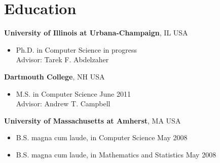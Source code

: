 \section{\sc Education}
{\bf University of Illinois at Urbana-Champaign}, IL USA
\begin{itemize}
\item Ph.D. in Computer Science \hfill in progress \\
Advisor: Tarek F. Abdelzaher
\end{itemize}

{\bf Dartmouth College}, NH USA
\begin{itemize}
\item M.S. in Computer Science \hfill June 2011 \\
Advisor: Andrew T. Campbell
\end{itemize}

{\bf University of Massachusetts at Amherst}, MA USA
\begin{itemize}
\item B.S. magna cum laude, in Computer Science \hfill May 2008
\item B.S. magna cum laude, in Mathematics and Statistics \hfill May 2008
\end{itemize}
